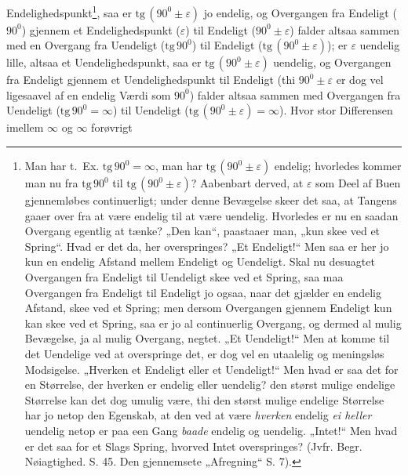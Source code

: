 \documentclass[12pt,a4paper]{book}
\begin{document}
\setcounter{footnote}{0}
Endelighedspunkt\footnote{Man har t.~Ex. $\mathrm{tg}\,90^{0} = \infty$,
man har $\mathrm{tg}\,(90^{0} \pm \varepsilon)$ endelig; hvorledes kommer
man nu fra $\mathrm{tg}\,90^{0}$ til $\mathrm{tg}\,(90^{0} \pm
\varepsilon)$? Aabenbart derved, at $\varepsilon$ som Deel af Buen
gjennemløbes continuerligt; under denne Bevægelse skeer det saa, at
Tangens gaaer over fra at være endelig til at være uendelig. Hvorledes
er nu en saadan Overgang egentlig at tænke? „Den kan“, paastaaer man,
„kun skee ved et Spring“. Hvad er det da, her overspringes? „Et
Endeligt!“ Men saa er her jo kun en endelig Afstand mellem Endeligt og
Uendeligt. Skal nu desuagtet Overgangen fra Endeligt til Uendeligt skee
ved et Spring, saa maa Overgangen fra Endeligt til Endeligt jo ogsaa,
naar det gjælder en endelig Afstand, skee ved et Spring; men dersom
Overgangen gjennem Endeligt kun kan skee ved et Spring, saa er jo al
continuerlig Overgang, og dermed al mulig Bevægelse, ja al mulig
Overgang, negtet. „Et Uendeligt!“ Men at komme til det Uendelige ved at
overspringe det, er dog vel en utaalelig og meningsløs Modsigelse.
„Hverken et Endeligt eller et Uendeligt!“ Men hvad er saa det for en
Størrelse, der hverken er endelig eller uendelig? den størst mulige
endelige Størrelse kan det dog umulig være, thi den størst mulige
endelige Størrelse har jo netop den Egenskab, at den ved at være
\emph{hverken} endelig \emph{ei heller} uendelig netop er paa een Gang
\emph{baade} endelig og uendelig. „Intet!“ Men hvad er det saa for et
Slags Spring, hvorved Intet overspringes? (Jvfr. Begr. Nøiagtighed.
S. 45. Den gjennemsete „Afregning“ S. 7).}, saa er
$\mathrm{tg}\,(90^{0} \pm \varepsilon)$ jo endelig, og Overgangen
fra Endeligt ($90^{0}$) gjennem et Endelighedspunkt ($\varepsilon$)
til Endeligt ($90^{0} \pm \varepsilon$) falder altsaa sammen med en
Overgang fra Uendeligt ($\mathrm{tg}\,90^{0}$) til Endeligt
($\mathrm{tg}\,(90^{0} \pm \varepsilon)$); er $\varepsilon$ uendelig
lille, altsaa et Uendelighedspunkt, saa er $\mathrm{tg}\,(90^{0} \pm
\varepsilon)$ uendelig, og Overgangen fra Endeligt gjennem et
Uendelighedspunkt til Endeligt (thi $90^{0} \pm \varepsilon$ er dog vel
ligesaavel af en endelig Værdi som $90^{0}$) falder altsaa sammen med
Overgangen fra Uendeligt ($\mathrm{tg}\,90^{0} = \infty$) til Uendeligt
($\mathrm{tg}\,(90^{0} \pm \varepsilon) = \infty$). Hvor stor
Differensen imellem $\infty$ og $\infty$ forøvrigt
\setcounter{footnote}{0}
\end{document}
